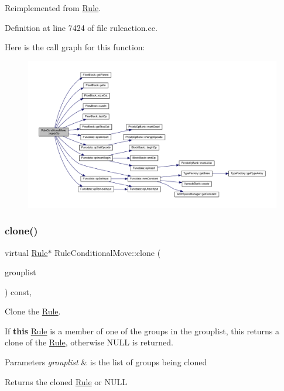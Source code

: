 Reimplemented from \mbox{\hyperlink{class_rule_a4e3e61f066670175009f60fb9dc60848}{Rule}}.



Definition at line 7424 of file ruleaction.\+cc.

Here is the call graph for this function\+:
\nopagebreak
\begin{figure}[H]
\begin{center}
\leavevmode
\includegraphics[width=350pt]{class_rule_conditional_move_a6f63597a783571c793f91a046166845b_cgraph}
\end{center}
\end{figure}
\mbox{\label{class_rule_conditional_move_a708caed50cbe0b065ed64b15100cfad2}} 
\subsubsection{\texorpdfstring{clone()}{clone()}}
{\footnotesize\ttfamily virtual \mbox{\hyperlink{class_rule}{Rule}}$\ast$ Rule\+Conditional\+Move\+::clone (\begin{DoxyParamCaption}\item[{const \mbox{\hyperlink{class_action_group_list}{Action\+Group\+List}} \&}]{grouplist }\end{DoxyParamCaption}) const\hspace{0.3cm}{\ttfamily [inline]}, {\ttfamily [virtual]}}



Clone the \mbox{\hyperlink{class_rule}{Rule}}. 

If {\bfseries{this}} \mbox{\hyperlink{class_rule}{Rule}} is a member of one of the groups in the grouplist, this returns a clone of the \mbox{\hyperlink{class_rule}{Rule}}, otherwise N\+U\+LL is returned. 
\begin{DoxyParams}{Parameters}
{\em grouplist} & is the list of groups being cloned \\
\hline
\end{DoxyParams}
\begin{DoxyReturn}{Returns}
the cloned \mbox{\hyperlink{class_rule}{Rule}} or N\+U\+LL 
\end{DoxyReturn}



